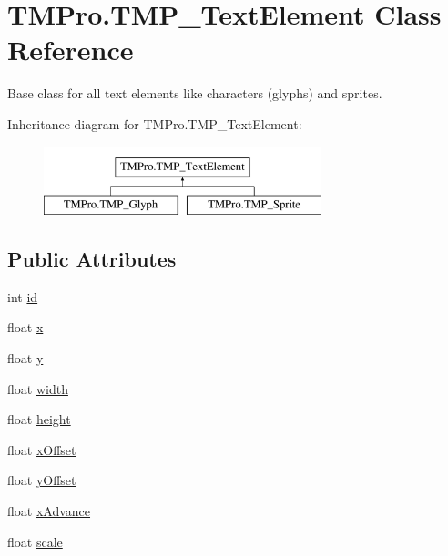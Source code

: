 \hypertarget{class_t_m_pro_1_1_t_m_p___text_element}{}\section{T\+M\+Pro.\+T\+M\+P\+\_\+\+Text\+Element Class Reference}
\label{class_t_m_pro_1_1_t_m_p___text_element}


Base class for all text elements like characters (glyphs) and sprites.  


Inheritance diagram for T\+M\+Pro.\+T\+M\+P\+\_\+\+Text\+Element\+:\begin{figure}[H]
\begin{center}
\leavevmode
\includegraphics[height=2.000000cm]{class_t_m_pro_1_1_t_m_p___text_element}
\end{center}
\end{figure}
\subsection*{Public Attributes}
\begin{DoxyCompactItemize}
\item 
int \mbox{\hyperlink{class_t_m_pro_1_1_t_m_p___text_element_ad6929a466e937d3db703223dfe1e66c7}{id}}
\item 
float \mbox{\hyperlink{class_t_m_pro_1_1_t_m_p___text_element_a584627e5824a29fbd54c2606798cc433}{x}}
\item 
float \mbox{\hyperlink{class_t_m_pro_1_1_t_m_p___text_element_a8e2cedf1184993e8d566bc0b95b8532e}{y}}
\item 
float \mbox{\hyperlink{class_t_m_pro_1_1_t_m_p___text_element_ae65ca9c0aba4731278f18a8c4890628b}{width}}
\item 
float \mbox{\hyperlink{class_t_m_pro_1_1_t_m_p___text_element_a8e0536e8531dafd5cd8737d0c4fb28bc}{height}}
\item 
float \mbox{\hyperlink{class_t_m_pro_1_1_t_m_p___text_element_ad7d4c5cd8e004c37301cebea4ccef2f1}{x\+Offset}}
\item 
float \mbox{\hyperlink{class_t_m_pro_1_1_t_m_p___text_element_a69b38f4991fe27916600dc332326ec80}{y\+Offset}}
\item 
float \mbox{\hyperlink{class_t_m_pro_1_1_t_m_p___text_element_aaf605eba3a287ec2c4f993790e444e72}{x\+Advance}}
\item 
float \mbox{\hyperlink{class_t_m_pro_1_1_t_m_p___text_element_a555701c73d767af5770e029ef3b243b2}{scale}}
\end{DoxyCompactItemize}


